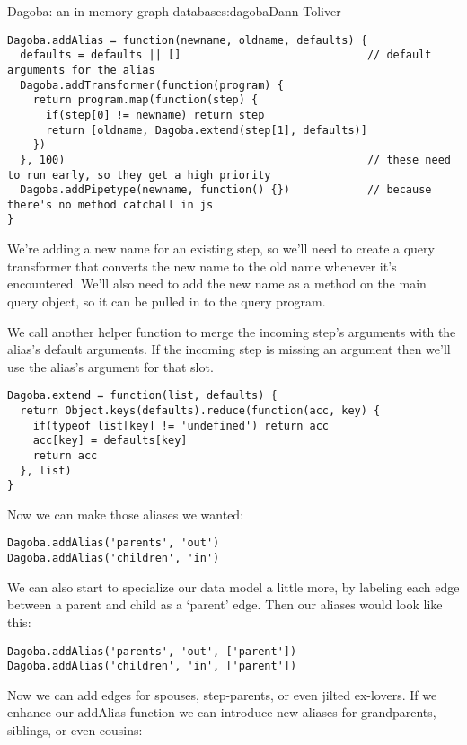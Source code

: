 \begin{aosachapter}{Dagoba: an in-memory graph database}{s:dagoba}{Dann Toliver}
\begin{verbatim}
Dagoba.addAlias = function(newname, oldname, defaults) {
  defaults = defaults || []                             // default arguments for the alias
  Dagoba.addTransformer(function(program) {
    return program.map(function(step) {
      if(step[0] != newname) return step
      return [oldname, Dagoba.extend(step[1], defaults)]
    })
  }, 100)                                               // these need to run early, so they get a high priority
  Dagoba.addPipetype(newname, function() {})            // because there's no method catchall in js
}
\end{verbatim}

We're adding a new name for an existing step, so we'll need to create a
query transformer that converts the new name to the old name whenever
it's encountered. We'll also need to add the new name as a method on the
main query object, so it can be pulled in to the query program.

We call another helper function to merge the incoming step's arguments
with the alias's default arguments. If the incoming step is missing an
argument then we'll use the alias's argument for that slot.

\begin{verbatim}
Dagoba.extend = function(list, defaults) {
  return Object.keys(defaults).reduce(function(acc, key) {
    if(typeof list[key] != 'undefined') return acc
    acc[key] = defaults[key]
    return acc
  }, list)
}
\end{verbatim}

Now we can make those aliases we wanted:

\begin{verbatim}
Dagoba.addAlias('parents', 'out')
Dagoba.addAlias('children', 'in')
\end{verbatim}

We can also start to specialize our data model a little more, by
labeling each edge between a parent and child as a `parent' edge. Then
our aliases would look like this:

\begin{verbatim}
Dagoba.addAlias('parents', 'out', ['parent'])
Dagoba.addAlias('children', 'in', ['parent'])
\end{verbatim}

Now we can add edges for spouses, step-parents, or even jilted
ex-lovers. If we enhance our addAlias function we can introduce new
aliases for grandparents, siblings, or even cousins:


\end{aosachapter}
